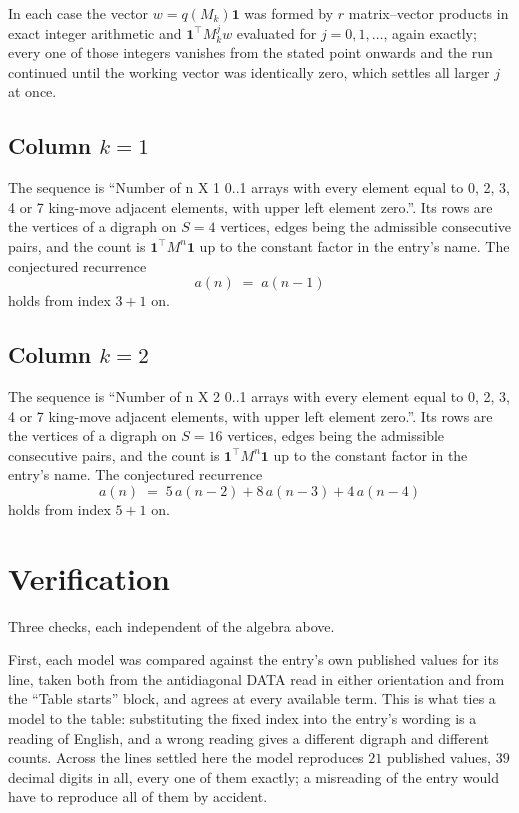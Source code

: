 \documentclass[11pt,a4paper]{article}
\theoremstyle{plain}
\theoremstyle{definition}
\begin{document}
In each case the vector $w=q(M_k)\mathbf{1}$ was formed by $r$ matrix--vector products in
exact integer arithmetic and $\mathbf{1}^{\!\top}M_k^{j}w$ evaluated for $j=0,1,\dots$,
again exactly; every one of those integers vanishes from the stated point onwards and the run
continued until the working vector was identically zero, which settles all larger $j$ at once.

\subsection*{Column $k$$=1$}
The sequence is ``Number of n X 1 0..1 arrays with every element equal to 0, 2, 3, 4 or 7 king-move adjacent elements, with upper left element zero.''. Its rows are the vertices of a digraph on
$S=4$ vertices, edges being the admissible consecutive pairs, and the count is
$\mathbf{1}^{\!\top}M^{n}\mathbf{1}$ up to the constant factor in the entry's name.
The conjectured recurrence
\[
a(n)\;=\;a(n-1)
\]
holds from index $3+1$ on.

\subsection*{Column $k$$=2$}
The sequence is ``Number of n X 2 0..1 arrays with every element equal to 0, 2, 3, 4 or 7 king-move adjacent elements, with upper left element zero.''. Its rows are the vertices of a digraph on
$S=16$ vertices, edges being the admissible consecutive pairs, and the count is
$\mathbf{1}^{\!\top}M^{n}\mathbf{1}$ up to the constant factor in the entry's name.
The conjectured recurrence
\[
a(n)\;=\;5\,a(n-2) + 8\,a(n-3) + 4\,a(n-4)
\]
holds from index $5+1$ on.

\section{Verification}

Three checks, each independent of the algebra above.

First, each model was compared against the entry's own published values for its line, taken
both from the antidiagonal DATA read in either orientation and from the ``Table starts''
block, and agrees at every available term. This is what ties a model to the table:
substituting the fixed index into the entry's wording is a reading of English, and a wrong
reading gives a different digraph and different counts. Across the lines settled here the
model reproduces $21$ published values, $39$ decimal digits in all, every one of
them exactly; a misreading of the entry would have to reproduce all of them by accident.
\end{document}
